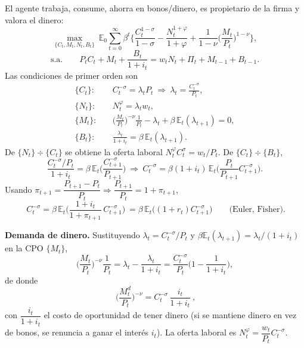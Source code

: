 \documentclass[11pt]{article}
\renewcommand{\boxed}[1]{#1}     %
\theoremstyle{definition}
\newcommand{\E}{\mathbb{E}}
\begin{document}
El agente trabaja, consume, ahorra en bonos/dinero, es propietario de la firma y valora el dinero:
\begin{equation}
\max_{\{C_{t},M_{t},N_{t},B_{t}\}}\ \E_{0}\sum_{t=0}^{\infty}\beta^{t}
\Big\{\frac{C_{t}^{1-\sigma}}{1-\sigma}-\frac{N_{t}^{1+\varphi}}{1+\varphi}
+\frac{1}{1-\nu}\Big(\frac{M_{t}}{P_{t}}\Big)^{1-\nu}\Big\},
\end{equation}
\begin{equation}
\text{s.a.}\qquad
P_{t}C_{t}+M_{t}+\frac{B_{t}}{1+i_{t}}=w_{t}N_{t}+\Pi_{t}+M_{t-1}+B_{t-1}.
\end{equation}
Las condiciones de primer orden son
\begin{align}
\{C_{t}\}:\quad & C_{t}^{-\sigma}=\lambda_{t}P_{t}\ \Longrightarrow\ \lambda_{t}=\frac{C_{t}^{-\sigma}}{P_{t}}, \\
\{N_{t}\}:\quad & N_{t}^{\varphi}=\lambda_{t}w_{t}, \\
\{M_{t}\}:\quad & \Big(\frac{M_{t}}{P_{t}}\Big)^{-\nu}\frac{1}{P_{t}}-\lambda_{t}+\beta\,\E_{t}(\lambda_{t+1})=0, \\
\{B_{t}\}:\quad & \frac{\lambda_{t}}{1+i_{t}}=\beta\,\E_{t}(\lambda_{t+1}) .
\end{align}
De $\{N_{t}\}\div\{C_{t}\}$ se obtiene la oferta laboral $N_{t}^{\varphi}C_{t}^{\sigma}=w_{t}/P_{t}$.
De $\{C_{t}\}\div\{B_{t}\}$,
\begin{equation}
\frac{C_{t}^{-\sigma}/P_{t}}{1+i_{t}}=\beta\,\E_{t}\Big(\frac{C_{t+1}^{-\sigma}}{P_{t+1}}\Big)
\ \Longrightarrow\
C_{t}^{-\sigma}=\beta(1+i_{t})\,\E_{t}\Big(\frac{P_{t}}{P_{t+1}}C_{t+1}^{-\sigma}\Big) .
\end{equation}
Usando $\pi_{t+1}=\dfrac{P_{t+1}-P_{t}}{P_{t}}\Rightarrow\dfrac{P_{t+1}}{P_{t}}=1+\pi_{t+1}$,
\begin{equation}
\boxed{\ C_{t}^{-\sigma}=\beta\,\E_{t}\!\Big(\frac{1+i_{t}}{1+\pi_{t+1}}\,C_{t+1}^{-\sigma}\Big)\ }
=\beta\,\E_{t}\big((1+r_{t})C_{t+1}^{-\sigma}\big)\qquad\text{(Euler, Fisher).}
\end{equation}

\textbf{Demanda de dinero.} Sustituyendo $\lambda_{t}=C_{t}^{-\sigma}/P_{t}$ y
$\beta\E_{t}(\lambda_{t+1})=\lambda_{t}/(1+i_{t})$ en la CPO $\{M_{t}\}$,
\begin{equation}
\Big(\frac{M_{t}}{P_{t}}\Big)^{-\nu}\frac{1}{P_{t}}=\lambda_{t}-\frac{\lambda_{t}}{1+i_{t}}
=\frac{C_{t}^{-\sigma}}{P_{t}}\Big(1-\frac{1}{1+i_{t}}\Big),
\end{equation}
de donde
\begin{equation}
\boxed{\ \Big(\frac{M_{t}^{d}}{P_{t}}\Big)^{-\nu}=C_{t}^{-\sigma}\,\frac{i_{t}}{1+i_{t}}\ },
\end{equation}
con $\dfrac{i_{t}}{1+i_{t}}$ el costo de oportunidad de tener dinero (si se mantiene dinero en vez de
bonos, se renuncia a ganar el interés $i_{t}$). La oferta laboral es
$N_{t}^{\varphi}=\dfrac{w_{t}}{P_{t}}C_{t}^{-\sigma}$.
\end{document}
